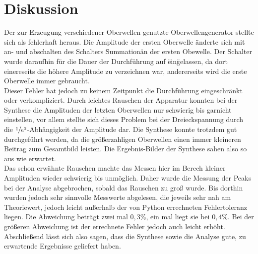 \section{Diskussion}
\label{sec:Diskussion}
Der zur Erzeugung verschiedener Oberwellen genutzte Oberwellengenerator stellte sich als fehlerhaft heraus.
Die Amplitude der ersten Oberwelle änderte sich mit an- und abschalten des Schalters \"Summation\" an der ersten Obewelle.
Der Schalter wurde daraufhin für die Dauer der Durchführung auf \"ein\" gelassen, da dort einereseits die höhere Amplitude
zu verzeichnen war, andererseits wird die erste Oberwelle immer gebraucht.\\  \noindent
Dieser Fehler hat jedoch zu keinem Zeitpunkt die Durchführung eingeschränkt oder verkompliziert. Durch leichtes Rauschen 
der Apparatur konnten bei der Synthese die Amplituden der letzten Oberwellen nur schwierig bis garnicht einstellen, vor allem
stellte sich dieses Problem bei der Dreieckspannung durch die $\sfrac{1}{n^2}$-Abhängigkeit der Amplitude dar. Die Synthese konnte 
trotzdem gut durchgeführt werden, da die größerzahligen Oberwellen einen immer kleineren Beitrag zum Gesamtbild leisten. Die Ergebnis-Bilder
der Synthese sahen also so aus wie erwartet. \\ \noindent
Das schon erwähnte Rauschen machte das Messen hier im Berech kleiner Amplituden wieder schwierig bis unmöglich. Daher wurde die Messung der Peaks
bei der Analyse abgebrochen, sobald das Rauschen zu groß wurde. Bis dorthin wurden jedoch sehr sinnvolle Messwerte abgelesen, die jeweils
sehr nah am Theoriewert, jedoch leicht außerhalb der von Python errechneten Fehlertoleranz liegen. Die Abweichung beträgt zwei mal 
$0,3\%$, ein mal liegt sie bei $0,4\%$. Bei der größeren Abweichung ist der errechnete Fehler jedoch auch leicht erhöht. Abschließend lässt sich also
sagen, dass die Synthese sowie die Analyse gute, zu erwartende Ergebnisse geliefert haben.


